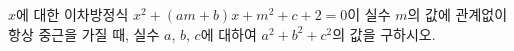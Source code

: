 $x$에 대한 이차방정식 $x^2+(am+b)x+m^2+c+2=0$이 실수 $m$의 값에 관계없이 항상 중근을 가질 때, 실수 $a$, $b$, $c$에 대하여 $a^2+b^2+c^2$의 값을 구하시오.

